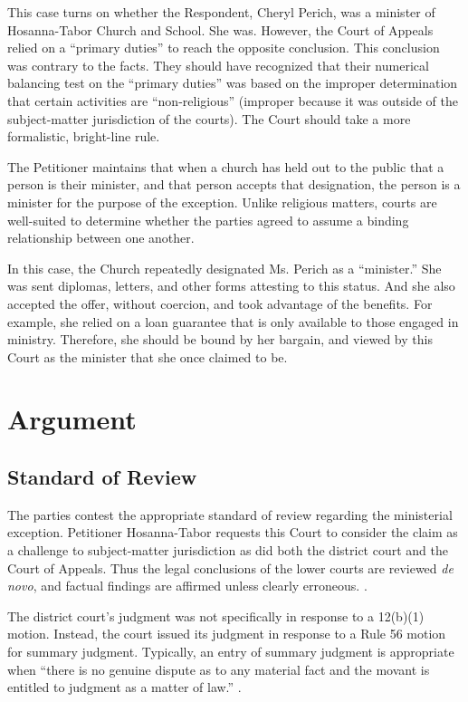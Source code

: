 \documentclass[12pt,\documentclassflag]{michiganCourtOfAppealsBrief}
\begin{document}
This case turns on whether the Respondent, Cheryl Perich, was a minister of Hosanna-Tabor Church and School. She was. However, the Court of Appeals relied on a ``primary duties'' to reach the opposite conclusion. This conclusion was contrary to the facts. They should have recognized that their numerical balancing test on the ``primary duties'' was based on the improper determination that certain activities are ``non-religious'' (improper because it was outside of the subject-matter jurisdiction of the courts). The Court should take a more formalistic, bright-line rule. 

The Petitioner maintains that when a church has held out to the public that a person is their minister, and that person accepts that designation, the person is a minister for the purpose of the exception. Unlike religious matters, courts are well-suited to determine whether the parties agreed to assume a binding relationship between one another.	

In this case, the Church repeatedly designated Ms. Perich as a ``minister.'' She was sent diplomas, letters, and other forms attesting to this status. And she also accepted the offer, without coercion, and took advantage of the benefits. For example, she relied on a loan guarantee that is only available to those engaged in ministry. Therefore, she should be bound by her bargain, and viewed by this Court as the minister that she once claimed to be.

\section{Argument}

\subsection{Standard of Review}

The parties contest the appropriate standard of review regarding the ministerial exception. Petitioner Hosanna-Tabor requests this Court to consider the claim as a challenge to subject-matter jurisdiction  as did both the district court and the Court of Appeals. Thus the legal conclusions of the lower courts are reviewed \emph{de novo}, and factual findings are affirmed unless clearly erroneous. \See {}.

The district court's judgment was not specifically in response to a 12(b)(1) motion. Instead, the court issued its judgment in response to a Rule 56 motion for summary judgment. Typically, an entry of summary judgment is appropriate when ``there is no genuine dispute as to any material fact and the movant is entitled to judgment as a matter of law.'' .
\end{document}
